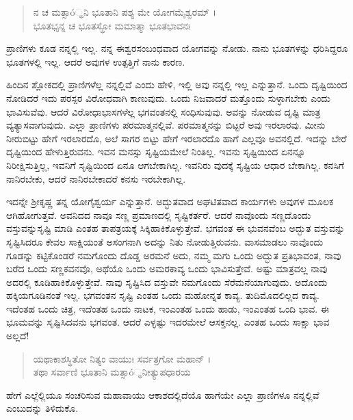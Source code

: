 \begin{verse}
ನ ಚ ಮತ್ಸಾó್ಥನಿ ಭೂತಾನಿ ಪಶ್ಯ ಮೇ ಯೋಗಮೈಶ್ವರಮ್ ।\\ಭೂತಭೃನ್ನ ಚ ಭೂತಸ್ಥೋ ಮಮಾತ್ಮಾ ಭೂತಭಾವನಃ 
\end{verse}

{\small ಪ್ರಾಣಿಗಳು ಕೂಡ ನನ್ನಲ್ಲಿ ಇಲ್ಲ. ನನ್ನ ಈಶ್ವರಸಂಬಂಧವಾದ ಯೋಗವನ್ನು ನೋಡು. ನಾನು ಭೂತಗಳನ್ನು ಧರಿಸಿದ್ದರೂ ಭೂತಗಳಲ್ಲಿ ಇಲ್ಲ. ಆದರೆ ಅವುಗಳ ಉತ್ಪತ್ತಿಗೆ ನಾನು ಕಾರಣ.}

ಹಿಂದಿನ ಶ್ಲೋಕದಲ್ಲಿ ಪ್ರಾಣಿಗಳೆಲ್ಲ ನನ್ನಲ್ಲಿವೆ ಎಂದು ಹೇಳಿ, ಇಲ್ಲಿ ಅವು ನನ್ನಲ್ಲಿ ಇಲ್ಲ ಎನ್ನುತ್ತಾನೆ. ಒಂದು ದೃಷ್ಟಿಯಿಂದ ನೋಡಿದರೆ ಇದು ಪರಸ್ಪರ ವಿರೋಧವಾಗಿ ಕಾಣುವುದು. ಒಂದು ನಿಜವಾದರೆ ಮತ್ತೊಂದು ಸುಳ್ಳಾಗಬೇಕು ಎಂದು ಭಾವಿಸುವೆವು. ಆದರೆ ವಿರೋಧಾಭಾಸಗಳೆಲ್ಲ ಭಗವಂತನಲ್ಲಿ ಸಂಧಿಸುವುವು. ಅವನ್ನು ನೋಡುವ ದೃಷ್ಟಿ ಮಾತ್ರ ವ್ಯತ್ಯಾಸವಾಗುವುದು. ಎಲ್ಲಾ ಪ್ರಾಣಿಗಳು ಪರಮಾತ್ಮನಲ್ಲಿವೆ. ಪರಮಾತ್ಮನನ್ನು ಬಿಟ್ಟರೆ ಅವು ಇರಲಾರವು. ಮೀನು ನೀರುಬಿಟ್ಟು ಹೇಗೆ ಇರಲಾರದೊ, ಅಲೆ ಸಾಗರ ಬಿಟ್ಟು ಹೇಗೆ ಇರಲಾರದೊ ಹಾಗೆ ಎಲ್ಲವೂ ಅವನಲ್ಲಿದೆ. ಇದನ್ನು ಬೇರೆ ದೃಷ್ಟಿಯಿಂದ ಹೇಳುತ್ತಿರುವನು. ಇವನ ಮನಸ್ಸು ಸೃಷ್ಟಿಯಮೇಲೆ ನಿಂತಿಲ್ಲ. ಇವನು ಸೃಷ್ಟಿಯಿಂದ ಏನನ್ನೂ ನಿರೀಕ್ಷಿಸುತ್ತಿಲ್ಲ, ಇವನಿಗೆ ಸೃಷ್ಟಿಯಿಂದ ಏನೂ ಆಗಬೇಕಾಗಿಲ್ಲ. ಇವನಿರು ವುದಕ್ಕೆ ಸೃಷ್ಟಿಯ ಆಧಾರ ಬೇಕಾಗಿಲ್ಲ. ಕನಸಿಗೆ ನಾನಿರಬೇಕು, ಆದರೆ ನಾನಿರಬೇಕಾದರೆ ಕನಸು ಇರಬೇಕಾಗಿಲ್ಲ.

ಇದನ್ನೇ ಶ್ರೀಕೃಷ್ಣ ತನ್ನ ಯೋಗೈಶ್ವರ್ಯ ಎನ್ನುತ್ತಾನೆ. ಅದ್ಭುತವಾದ ಅಘಟಿತವಾದ ಕಾರ್ಯಗಳು ಅವುಗಳ ಮೂಲಕ ಆಗಿಹೋಗುತ್ತವೆ. ಅವನಿದದ ನಾವೂ ಸಣ್ಣ ಪ್ರಮಾಣದಲ್ಲಿ ಸೃಷ್ಟಿಕರ್ತರೆ. ಆದರೆ ನಾವೊಂದು ಸಣ್ಣದೊಂದು ವಸ್ತುವನ್ನುಸೃಷ್ಟಿ ಮಾಡಿ ಎಂತಹ ತಾಪತ್ರಯಕ್ಕೆ ಸಿಕ್ಕಿಹಾಕಿಕೊಳ್ಳುತ್ತೇವೆ. ಭಗವಂತ ಈ ಭುವನವೆಂಬ ಅದ್ಭುತ ವಸ್ತುವನ್ನು ಸೃಷ್ಟಿಸಿದರೂ ಕೇವಲ ಸಾಕ್ಷಿಯಂತೆ ಅಸಂಗನಾಗಿ ಅದನ್ನು ನಿತು ನೋಡುತ್ತಿರುವನು. ವಾಸಮಾಡಲು ನಾವೊಂದು ಗೂಡನ್ನು ಕಟ್ಟಿಕೊಂಡರೆ ನಮಗೊಂದು ದೊಡ್ಡ ಅರಮನೆ ಅದು, ನಮ್ಮ ಮಗು ಒಂದು ಅದ್ಭುತ ಪ್ರತಿಭಾವಂತ, ನಾವು ಬರೆದ ಒಂದು ಸಣ್ಣಕವನವೊ, ಅಥೆಯೊ ಒಂದು ಅಮರಕಾವ್ಯ ಒಂದು ಭಾವಿಸುತ್ತೇವೆ. ಅಷ್ಟು ಮಾತ್ರವಲ್ಲ ನಾವು ಅದರಲ್ಲಿ ಕೂಡಿಹಾಕಿಕೊಳ್ಳುತ್ತೇವೆ. ನಾವು ಸೃಷ್ಟಿಸಿದ ವಸ್ತುವೇ ನಮಗೊಂದು ಸೆರೆಮನೆಯಾಗುವುದು. ಅದೊಂದು ಹಕ್ಕಿಯಗೂಡಿನಂತೆ ಇಲ್ಲ. ಭಗವಂತನ ಸೃಷ್ಟಿ ಎಂತಹ ಒಂದು ಮಹೋನ್ನತ ಕಾವ್ಯ. ತುದಿಮೊದಲಿಲ್ಲದ ಕಾವ್ಯ. ಇದೆಂತಹ ಒಂದು ಚಿತ್ರ, ಇದೆಂತಹ ಒಂದು ನಾಟಕ, ಇಂಎಂತಹ ಒಂದು ಹಾಡು, ಇಂಎಂತಹ ಒಂದಿ ಭಾವ. ಈ ಭೂಮವನ್ನು ಸೃಷ್ಟಿಸಿದವನು ಭಗವಂತ. ಆದರೆ ಎಳ್ಳಷ್ಟು ಇದರಮೇಲೆ ಆಸಕ್ತನಲ್ಲ. ಎಂತಹ ಒಂದು ಸಾಕ್ಷಾ ಭಾವ ಅಲ್ಲದೆ!

\begin{verse}
ಯಥಾಕಾಶಸ್ಥಿತೋ ನಿತ್ಯಂ ವಾಯುಃ ಸರ್ವತ್ರಗೋ ಮಹಾನ್ ।\\ತಥಾ ಸರ್ವಾಣಿ ಭೂತಾನಿ ಮತ್ಸಾó್ಥನೀತ್ಯುಪಧಾರಯ 
\end{verse}

ಹೇಗೆ ಎಲ್ಲೆಲ್ಲಿಯೂ ಸಂಚರಿಸುವ ಮಹಾವಾಯು ಆಕಾಶದಲ್ಲಿದೆಯೊ ಹಾಗೆಯೇ ಎಲ್ಲಾ ಪ್ರಾಣಿಗಳೂ ನನ್ನಲ್ಲಿವೆ ಎಂಬುದನ್ನು ತಿಳಿದುಕೊ.

